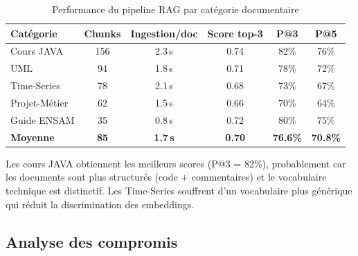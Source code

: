 \documentclass[12pt, a4paper]{article}
\begin{document}
\begin{table}[H]
\centering
\caption{Performance du pipeline RAG par catégorie documentaire}
\label{tab:rag_results}
\small
\begin{tabularx}{\textwidth}{l c c c c c}
\toprule
\textbf{Catégorie} & \textbf{Chunks} & \textbf{Ingestion/doc} & \textbf{Score top-3} & \textbf{P@3} & \textbf{P@5} \\
\midrule
Cours JAVA & 156 & 2.3\,s & 0.74 & 82\% & 76\% \\
UML & 94 & 1.8\,s & 0.71 & 78\% & 72\% \\
Time-Series & 78 & 2.1\,s & 0.68 & 73\% & 67\% \\
Projet-Métier & 62 & 1.5\,s & 0.66 & 70\% & 64\% \\
Guide ENSAM & 35 & 0.8\,s & 0.72 & 80\% & 75\% \\
\midrule
\rowcolor{ensambg}
\textbf{Moyenne} & \textbf{85} & \textbf{1.7\,s} & \textbf{0.70} & \textbf{76.6\%} & \textbf{70.8\%} \\
\bottomrule
\end{tabularx}
\end{table}

Les cours JAVA obtiennent les meilleurs scores (P@3 = 82\%), probablement car les documents sont plus structurés (code + commentaires) et le vocabulaire technique est distinctif. Les Time-Series souffrent d'un vocabulaire plus générique qui réduit la discrimination des embeddings.

\subsection{Analyse des compromis}
\end{document}
